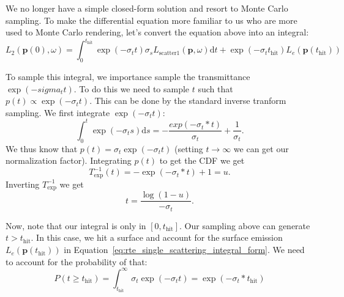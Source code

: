We no longer have a simple closed-form solution and resort to Monte Carlo sampling. To make the differential equation more familiar to us who are more used to Monte Carlo rendering, let's convert the equation above into an integral:
\begin{equation}
L_2(\mathbf{p}(0), \omega) = \int_{0}^{t_{\text{hit}}} \exp\left(-\sigma_t t \right) \sigma_s L_{\text{scatter}1}(\mathbf{p}, \omega) \mathrm{d}t + \exp\left(-\sigma_t t_{\text{hit}} \right) L_e(\mathbf{p}(t_{\text{hit}}))
\label{eq:rte_single_scattering_integral_form}
\end{equation}

To sample this integral, we importance sample the transmittance $\exp\left(-sigma_t t\right)$. To do this we need to sample $t$ such that $p(t) \propto \exp\left(-\sigma_t t\right)$. This can be done by the standard inverse tranform sampling. We first integrate $\exp\left(-\sigma_t t \right)$:
\begin{equation}
\int_{0}^{t} \exp\left(-\sigma_t s\right) \mathrm{d}s = -\frac{exp(-\sigma_t * t)}{\sigma_t} + \frac{1}{\sigma_t}.
\end{equation}
We thus know that $p(t) = \sigma_t\exp\left(-\sigma_t t\right)$ (setting $t \rightarrow \infty$ we can get our normalization factor). Integrating $p(t)$ to get the CDF we get
\begin{equation}
T_{\text{exp}}^{-1}(t) = -\exp\left(-\sigma_t * t\right) + 1 = u.
\end{equation}
Inverting $T_{\text{exp}}^{-1}$ we get
\begin{equation}
t = \frac{\log\left(1 - u\right)}{-\sigma_t}.
\end{equation}

Now, note that our integral is only in $[0, t_{\text{hit}}]$. Our sampling above can generate $t > t_{\text{hit}}$. In this case, we hit a surface and account for the surface emission $L_e(\mathbf{p}(t_{\text{hit}}))$ in Equation~\ref{eq:rte_single_scattering_integral_form}. We need to account for the probability of that:
\begin{equation}
P(t \geq t_{\text{hit}}) = \int_{t_{\text{hit}}}^{\infty} \sigma_t\exp\left(-\sigma_t t\right) = \exp\left(-\sigma_t * t_{\text{hit}}\right)
\label{eq:hit_surface_prob}
\end{equation}

